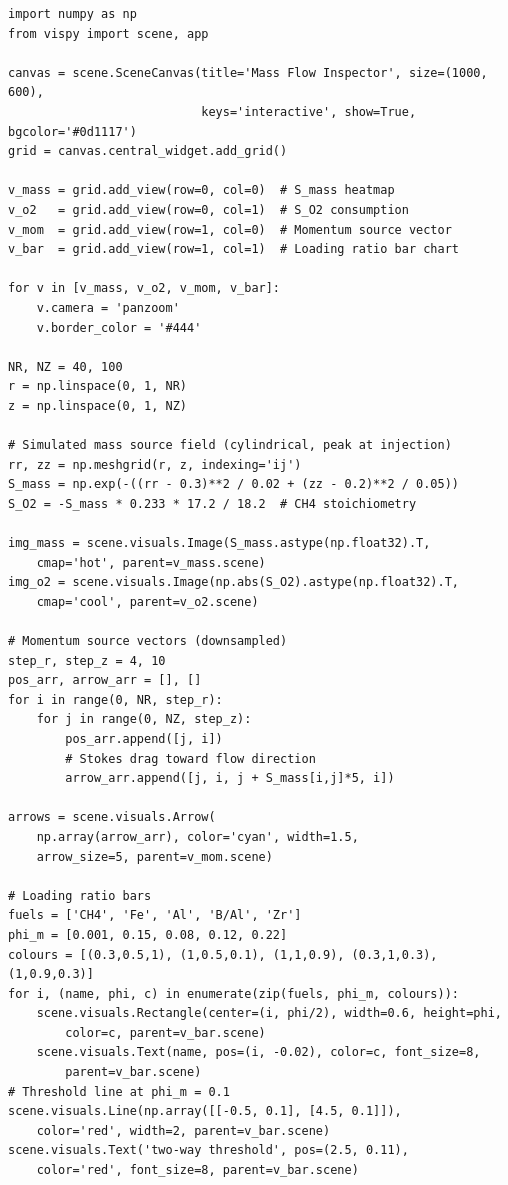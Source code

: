 \documentclass[11pt,a4paper]{article}
\begin{document}
\begin{lstlisting}[title={\textbf{Live Mass Flow \& Source-Term Inspector}}]
import numpy as np
from vispy import scene, app

canvas = scene.SceneCanvas(title='Mass Flow Inspector', size=(1000, 600),
                           keys='interactive', show=True, bgcolor='#0d1117')
grid = canvas.central_widget.add_grid()

v_mass = grid.add_view(row=0, col=0)  # S_mass heatmap
v_o2   = grid.add_view(row=0, col=1)  # S_O2 consumption
v_mom  = grid.add_view(row=1, col=0)  # Momentum source vector
v_bar  = grid.add_view(row=1, col=1)  # Loading ratio bar chart

for v in [v_mass, v_o2, v_mom, v_bar]:
    v.camera = 'panzoom'
    v.border_color = '#444'

NR, NZ = 40, 100
r = np.linspace(0, 1, NR)
z = np.linspace(0, 1, NZ)

# Simulated mass source field (cylindrical, peak at injection)
rr, zz = np.meshgrid(r, z, indexing='ij')
S_mass = np.exp(-((rr - 0.3)**2 / 0.02 + (zz - 0.2)**2 / 0.05))
S_O2 = -S_mass * 0.233 * 17.2 / 18.2  # CH4 stoichiometry

img_mass = scene.visuals.Image(S_mass.astype(np.float32).T,
    cmap='hot', parent=v_mass.scene)
img_o2 = scene.visuals.Image(np.abs(S_O2).astype(np.float32).T,
    cmap='cool', parent=v_o2.scene)

# Momentum source vectors (downsampled)
step_r, step_z = 4, 10
pos_arr, arrow_arr = [], []
for i in range(0, NR, step_r):
    for j in range(0, NZ, step_z):
        pos_arr.append([j, i])
        # Stokes drag toward flow direction
        arrow_arr.append([j, i, j + S_mass[i,j]*5, i])

arrows = scene.visuals.Arrow(
    np.array(arrow_arr), color='cyan', width=1.5,
    arrow_size=5, parent=v_mom.scene)

# Loading ratio bars
fuels = ['CH4', 'Fe', 'Al', 'B/Al', 'Zr']
phi_m = [0.001, 0.15, 0.08, 0.12, 0.22]
colours = [(0.3,0.5,1), (1,0.5,0.1), (1,1,0.9), (0.3,1,0.3), (1,0.9,0.3)]
for i, (name, phi, c) in enumerate(zip(fuels, phi_m, colours)):
    scene.visuals.Rectangle(center=(i, phi/2), width=0.6, height=phi,
        color=c, parent=v_bar.scene)
    scene.visuals.Text(name, pos=(i, -0.02), color=c, font_size=8,
        parent=v_bar.scene)
# Threshold line at phi_m = 0.1
scene.visuals.Line(np.array([[-0.5, 0.1], [4.5, 0.1]]),
    color='red', width=2, parent=v_bar.scene)
scene.visuals.Text('two-way threshold', pos=(2.5, 0.11),
    color='red', font_size=8, parent=v_bar.scene)


\end{lstlisting}
\end{document}

